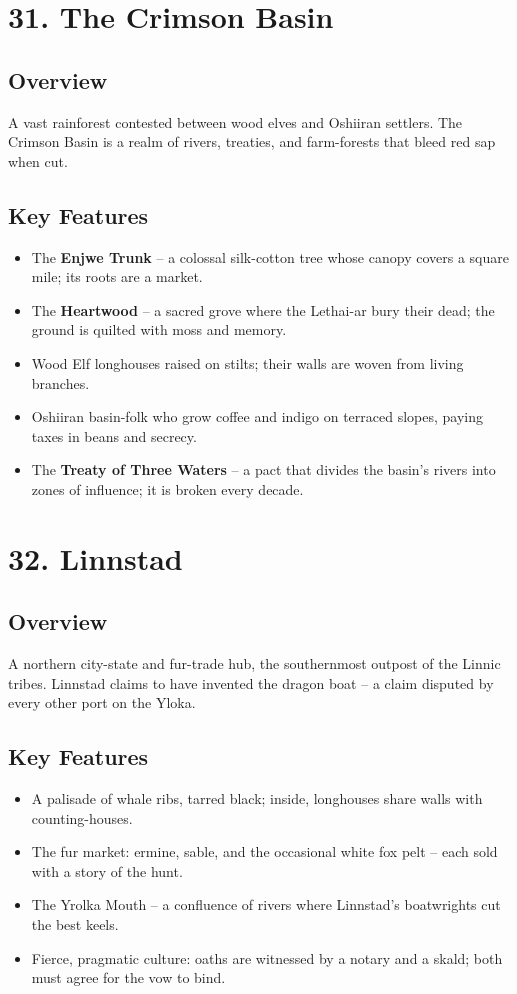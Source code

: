 \documentclass[11pt]{article}
\begin{document}
\section*{31. The Crimson Basin}

\subsection*{Overview}
A vast rainforest contested between wood elves and Oshiiran settlers. The Crimson Basin is a realm of rivers, treaties, and farm-forests that bleed red sap when cut.

\subsection*{Key Features}
\begin{itemize}[leftmargin=*]
    \item The \textbf{Enjwe Trunk} -- a colossal silk-cotton tree whose canopy covers a square mile; its roots are a market.
    \item The \textbf{Heartwood} -- a sacred grove where the Lethai-ar bury their dead; the ground is quilted with moss and memory.
    \item Wood Elf longhouses raised on stilts; their walls are woven from living branches.
    \item Oshiiran basin-folk who grow coffee and indigo on terraced slopes, paying taxes in beans and secrecy.
    \item The \textbf{Treaty of Three Waters} -- a pact that divides the basin's rivers into zones of influence; it is broken every decade.
\end{itemize}

\section*{32. Linnstad}

\subsection*{Overview}
A northern city-state and fur-trade hub, the southernmost outpost of the Linnic tribes. Linnstad claims to have invented the dragon boat -- a claim disputed by every other port on the Yloka.

\subsection*{Key Features}
\begin{itemize}[leftmargin=*]
    \item A palisade of whale ribs, tarred black; inside, longhouses share walls with counting-houses.
    \item The fur market: ermine, sable, and the occasional white fox pelt -- each sold with a story of the hunt.
    \item The Yrolka Mouth -- a confluence of rivers where Linnstad's boatwrights cut the best keels.
    \item Fierce, pragmatic culture: oaths are witnessed by a notary and a skald; both must agree for the vow to bind.
\end{itemize}
\end{document}
